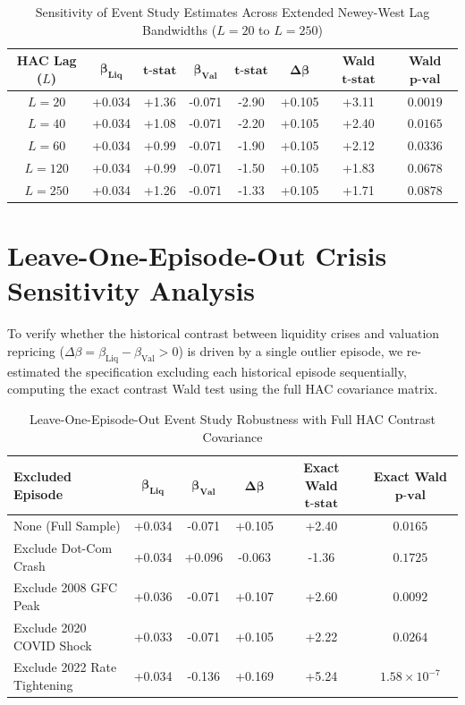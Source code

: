 \documentclass[12pt]{article}
\begin{document}
\begin{table}[htbp]
\centering
\caption{Sensitivity of Event Study Estimates Across Extended Newey-West Lag Bandwidths ($L=20$ to $L=250$)}
\label{tab:app_hac_sensitivity}
\begin{tabular}{cccccccc}
\toprule
\textbf{HAC Lag ($L$)} & $\mathbf{\beta_{\text{Liq}}}$ & $\mathbf{t\text{-stat}}$ & $\mathbf{\beta_{\text{Val}}}$ & $\mathbf{t\text{-stat}}$ & $\mathbf{\Delta \beta}$ & \textbf{Wald } $\mathbf{t\text{-stat}}$ & \textbf{Wald } $\mathbf{p\text{-val}}$ \\
\midrule
$L = 20$  & +0.034 & +1.36 & -0.071 & -2.90 & +0.105 & +3.11 & $0.0019$ \\
$L = 40$  & +0.034 & +1.08 & -0.071 & -2.20 & +0.105 & +2.40 & $0.0165$ \\
$L = 60$  & +0.034 & +0.99 & -0.071 & -1.90 & +0.105 & +2.12 & $0.0336$ \\
$L = 120$  & +0.034 & +0.99 & -0.071 & -1.50 & +0.105 & +1.83 & $0.0678$ \\
$L = 250$  & +0.034 & +1.26 & -0.071 & -1.33 & +0.105 & +1.71 & $0.0878$ \\
\bottomrule
\end{tabular}
\end{table}

\section{Leave-One-Episode-Out Crisis Sensitivity Analysis}
\label{app:leave_one_out}

To verify whether the historical contrast between liquidity crises and valuation repricing ($\Delta \beta = \beta_{\text{Liq}} - \beta_{\text{Val}} > 0$) is driven by a single outlier episode, we re-estimated the specification excluding each historical episode sequentially, computing the exact contrast Wald test using the full HAC covariance matrix.

\begin{table}[htbp]
\centering
\caption{Leave-One-Episode-Out Event Study Robustness with Full HAC Contrast Covariance}
\label{tab:app_leave_one_out}
\begin{tabular}{lccccc}
\toprule
\textbf{Excluded Episode} & $\mathbf{\beta_{\text{Liq}}}$ & $\mathbf{\beta_{\text{Val}}}$ & $\mathbf{\Delta \beta}$ & \textbf{Exact Wald } $\mathbf{t\text{-stat}}$ & \textbf{Exact Wald } $\mathbf{p\text{-val}}$ \\
\midrule
None (Full Sample) & +0.034 & -0.071 & +0.105 & +2.40 & $0.0165$ \\
Exclude Dot-Com Crash & +0.034 & +0.096 & -0.063 & -1.36 & $0.1725$ \\
Exclude 2008 GFC Peak & +0.036 & -0.071 & +0.107 & +2.60 & $0.0092$ \\
Exclude 2020 COVID Shock & +0.033 & -0.071 & +0.105 & +2.22 & $0.0264$ \\
Exclude 2022 Rate Tightening & +0.034 & -0.136 & +0.169 & +5.24 & $1.58 \times 10^{-7}$ \\
\bottomrule
\end{tabular}
\end{table}
\end{document}
